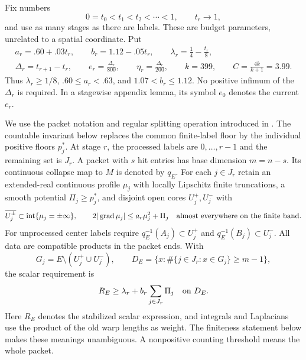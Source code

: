Fix numbers
\[
 0=t_0<t_1<t_2<\cdots<1,\qquad t_r\longrightarrow1,
\]
and use as many stages as there are labels. These are budget parameters,
unrelated to a spatial coordinate. Put
\begin{equation}\label{countable:constants}
 \begin{gathered}
 a_r=.60+.03t_r,\qquad b_r=1.12-.05t_r,
 \qquad \lambda_r=\frac14-\frac{t_r}{8},\\
 \Delta_r=t_{r+1}-t_r,\qquad
 e_r=\frac{\Delta_r}{800},\qquad
 \eta_r=\frac{\Delta_r}{200},\qquad k=399,
 \qquad C=\frac{4k}{k+1}=3.99.
 \end{gathered}
\end{equation}
Thus $\lambda_r\ge1/8$, $.60\le a_r<.63$, and
$1.07<b_r\le1.12$. No positive infimum of the $\Delta_r$ is required. In a stagewise
appendix lemma, its symbol $e_0$ denotes the current $e_r$.

We use the packet notation and regular splitting operation introduced in
. The countable invariant below replaces the common
finite-label floor by the individual positive floors $p_j^*$.
At stage $r$, the processed labels are $0,\ldots,r-1$ and the remaining
set is $J_r$. A packet with $s$ hit entries has base dimension $m=n-s$.
Its continuous collapse map to $M$ is denoted by $q_E$. For each
$j\in J_r$ retain an extended-real continuous profile $\mu_j$ with
locally Lipschitz finite truncations, a smooth potential
$\Pi_j\ge p_j^*$, and disjoint open cores $U_j^+,U_j^-$ with
\begin{equation}\label{countable:profile-invariant}
 \overline{U_j^\pm}\subset\operatorname{int}\{\mu_j=\pm\infty\},
 \qquad 2|\operatorname{grad}\mu_j|\le a_r\mu_j^2+\Pi_j
 \quad\hbox{almost everywhere on the finite band}.
\end{equation}
For unprocessed center labels require
$q_E^{-1}(A_j)\subset U_j^+$ and $q_E^{-1}(B_j)\subset U_j^-$.
All data are compatible products in the packet ends. With
\begin{equation}\label{countable:required}
 G_j=E\setminus(U_j^+\cup U_j^-),\qquad
 D_E=\{x:\#\{j\in J_r:x\in G_j\}\ge m-1\},
\end{equation}
the scalar requirement is
\begin{equation}\label{countable:scalar-invariant}
 R_E\ge\lambda_r+b_r\sum_{j\in J_r}\Pi_j\quad\hbox{on }D_E.
\end{equation}
Here $R_E$ denotes the stabilized scalar expression, and integrals and
Laplacians use the product of the old warp lengths as weight. The
finiteness statement below makes these meanings unambiguous. A nonpositive
counting threshold means the whole packet.

